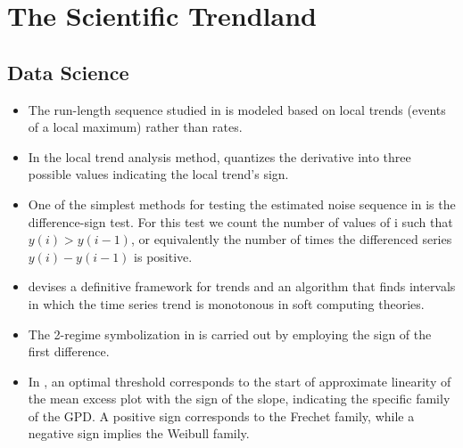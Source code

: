 \documentclass[11pt]{book}
\begin{document}
\chapter{The Scientific Trendland}
\section{Data Science}
\begin{itemize}
\item The run-length sequence studied in \cite{cammarota2011difference}
is modeled based on local trends (events of a local maximum) rather
than rates.
\item In the local trend analysis method, \cite{tang2015evaluation}
quantizes the derivative into three possible values indicating the
local trend's sign.
\item One of the simplest methods for testing the estimated noise sequence
in \cite{brockwell2016introduction} is the
difference-sign test. For this test we count the number of values
of i such that $y\left(i\right)>y\left(i-1\right)$, or equivalently
the number of times the differenced series $y\left(i\right)-y\left(i-1\right)$
is positive.
\item \cite{novak2016linguistic} devises a
definitive framework for trends and an algorithm that finds intervals
in which the time series trend is monotonous in soft computing theories.
\item The 2-regime symbolization in \cite{ponce2020time}
is carried out by employing the sign of the first difference.
\item In \cite{kithinji2021adjusted},
an optimal threshold corresponds to the start of approximate linearity
of the mean excess plot with the sign of the slope, indicating the
specific family of the GPD. A positive sign corresponds to the Frechet
family, while a negative sign implies the Weibull family.
\end{itemize}

\end{document}
